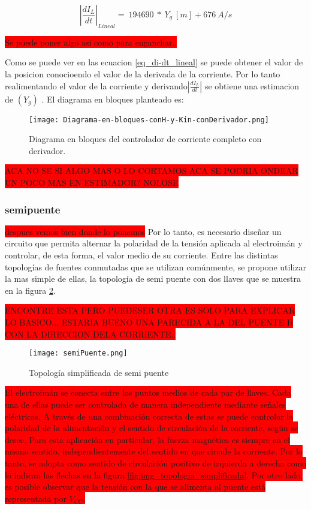 \begin{equation} \label{eq_di-dt_lineal}
	{\left|\frac{{dI}_L}{dt}\right|}_{Lineal}=\ 194690\ *\ Y_g\:[m]+676\:A/s
\end{equation}

\colorbox{red}{Se puede poner algo asi como para enganchar..}

Como se puede ver en las ecuacion \ref{eq_di-dt_lineal} se puede obtener el valor de la posicion conocioendo el valor de la derivada de la corriente. Por lo tanto realimentando el valor de la corriente y derivando$\left|\frac{{dI}_L}{dt}\right|$ se obtiene una estimacion de $(Y_g)$ . El diagrama en bloques planteado es:

\begin{figure}[H]
	\centering
	\texttt{[image: Diagrama-en-bloques-conH-y-Kin-conDerivador.png]}
	\caption{Diagrama en bloques del controlador de corriente completo con derivador.}
	\label{fig:img_diag-en-bloques-conH-y-Kin-con-Derivador}
\end{figure}


\colorbox{red}{ACA NO SE SI ALGO MAS O LO CORTAMOS ACA SE PODRIA ONDEAR UN POCO MAS EN ESTIMADOR? NOLOSE}


\subsubsection{semipuente}
\colorbox{red}{despues vemos bien donde lo ponemos}
Por lo tanto, es necesario diseñar un circuito que permita alternar la polaridad de la tensión aplicada al electroimán y controlar, de esta forma, el valor medio de su corriente. Entre las distintas topologías de fuentes conmutadas que se utilizan comúnmente, se propone utilizar la mas simple de ellas, la topología de semi puente con dos llaves que se muestra en la figura \ref{fig:img_topologia_semipuente}.

\colorbox{red}{ENCONTRE ESTA PERO PUEDESER OTRA ES SOLO PARA EXPLICAR LO BASICO... ESTARIA BUENO UNA PARECIDA A LA DEL PUENTE H CON LA DIRECCION DELA CORRIENTE.. }
\begin{figure}[H]
	\centering
	\texttt{[image: semiPuente.png]}
	\caption{Topología simplificada de semi puente}
	\label{fig:img_topologia_semipuente}
\end{figure} 

\colorbox{red}{
	El electroimán se conecta entre los puntos medios de cada par de llaves. Cada una de ellas puede ser controlada de manera independiente mediante señales eléctricas. A través de una combinación correcta de estas se puede controlar la polaridad de la alimentación y el sentido de circulación de la corriente, según se desee. Para esta aplicación en particular, la fuerza magnética es siempre en el mismo sentido, independientemente del sentido en que circule la corriente. Por lo tanto, se adopta como sentido de circulación positivo de izquierda a derecha como lo indican las flechas en la figura \ref{fig:img_topologia_simplificada}. Por otro lado, es posible observar que la tensión con la que se alimenta al puente está representada por $V_{CC}$.
}


